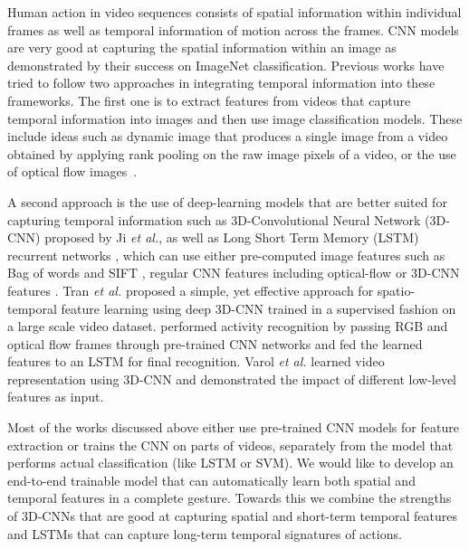 \documentclass{article}
\begin{document}
Human action in video sequences consists of spatial information within individual frames as well as temporal information of motion across the frames.
CNN models are very good at capturing the spatial information within an image as demonstrated by their success on ImageNet classification. Previous
works have tried to follow two approaches in integrating temporal information into these frameworks. The first one is to extract features from videos
that capture temporal information into images and then use image classification models. These include ideas such as dynamic image \cite{Bilen16a}
that produces a single image from a video obtained by applying rank pooling on the raw image pixels of a video, or the use of optical flow images~\cite{NIPS2014_5353}. 

A second approach is the use of deep-learning models that are better suited for capturing temporal information such as 3D-Convolutional Neural Network (3D-CNN)  \cite{Ji:2013:CNN:2412386.2412939} proposed by Ji \textit{et al.}, as well as Long Short Term Memory (LSTM) recurrent networks \cite{Hochreiter:1997:LSM:1246443.1246450}, which can use either pre-computed image features such as Bag of words and SIFT \cite{Baccouche:2010:ACS:1889001.1889024}, regular CNN features including optical-flow \cite{DBLP:journals/corr/NgHVVMT15} or 3D-CNN features \cite{Baccouche12spatio-temporalconvolutional}. Tran \textit{et al.} \cite{DBLP:journals/corr/TranBFTP14} proposed a simple, yet effective approach for spatio-temporal feature learning using deep 3D-CNN trained in a supervised fashion on a large scale video dataset. \cite{DBLP:journals/corr/NgHVVMT15} performed activity recognition by passing RGB and optical flow frames through pre-trained CNN networks and fed the learned features to an LSTM for final recognition. Varol \textit{et al.} \cite{varol16} learned video representation using 3D-CNN and demonstrated the impact of different low-level features as input.






Most of the works discussed above either use pre-trained CNN models for feature extraction or trains the CNN on parts of videos, separately from the model that performs actual classification (like LSTM or SVM). We would like to develop an end-to-end trainable model that can automatically learn both spatial and temporal features in a complete gesture. Towards this we combine the strengths of 3D-CNNs that are good at capturing spatial and short-term temporal features and LSTMs that can capture long-term temporal signatures of actions.
\end{document}
